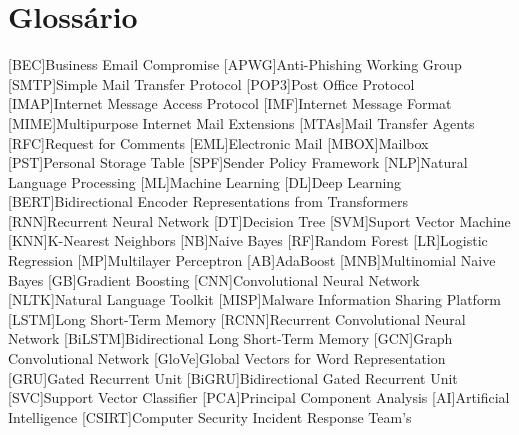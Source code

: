 \chapter{Glossário}

\footnotesize
\SingleSpacing

\begin{multicols}{2}
\begin{acronym}[AAAAAA]

	[BEC]{Business Email Compromise}
    [APWG]{Anti-Phishing Working Group}
	[SMTP]{Simple Mail Transfer Protocol}
	[POP3]{Post Office Protocol}
	[IMAP]{Internet Message Access Protocol}
	[IMF]{Internet Message Format}
	[MIME]{Multipurpose Internet Mail Extensions}
	[MTAs]{Mail Transfer Agents}
	[RFC]{Request for Comments}
	[EML]{Electronic Mail}
	[MBOX]{Mailbox}
	[PST]{Personal Storage Table}
	[SPF]{Sender Policy Framework}
	[NLP]{Natural Language Processing}
	[ML]{Machine Learning}
	[DL]{Deep Learning}
	[BERT]{Bidirectional Encoder Representations from Transformers}
	[RNN]{Recurrent Neural Network}
	[DT]{Decision Tree}
	[SVM]{Suport Vector Machine}
	[KNN]{K-Nearest Neighbors}
	[NB]{Naive Bayes}
	[RF]{Random Forest}
	[LR]{Logistic Regression}
	[MP]{Multilayer Perceptron}
	[AB]{AdaBoost}
	[MNB]{Multinomial Naive Bayes}
	[GB]{Gradient Boosting}
	[CNN]{Convolutional Neural Network}
	[NLTK]{Natural Language Toolkit}
	[MISP]{Malware Information Sharing Platform}
	[LSTM]{Long Short-Term Memory}
	[RCNN]{Recurrent Convolutional Neural Network}
	[BiLSTM]{Bidirectional Long Short-Term Memory}
	[GCN]{Graph Convolutional Network}
	[GloVe]{Global Vectors for Word Representation}
	[GRU]{Gated Recurrent Unit}
	[BiGRU]{Bidirectional Gated Recurrent Unit}
	[SVC]{Support Vector Classifier}
	[PCA]{Principal Component Analysis}
	[AI]{Artificial Intelligence}
	[CSIRT]{Computer Security Incident Response Team's}

\end{acronym}
\end{multicols}


